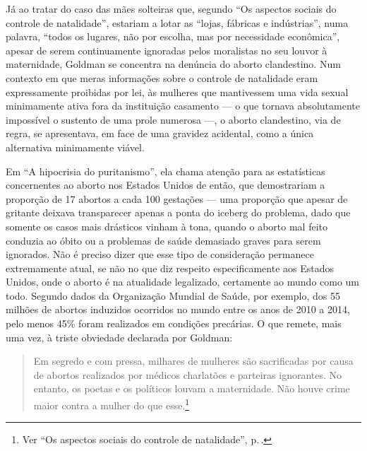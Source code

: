 Já ao
tratar do caso das mães solteiras que, segundo ``Os aspectos sociais
do controle de natalidade'', estariam a lotar as ``lojas, fábricas e
indústrias'', numa palavra, ``todos os lugares, não por escolha, mas por
necessidade econômica'', apesar de serem continuamente ignoradas pelos
moralistas no seu louvor à maternidade, Goldman se concentra na denúncia
do aborto clandestino. Num contexto em que meras informações sobre o
controle de natalidade eram expressamente proibidas por lei, às mulheres
que mantivessem uma vida sexual minimamente ativa fora da instituição
casamento --- o que tornava absolutamente impossível o sustento de uma
prole numerosa ---, o aborto clandestino, via de regra, se apresentava,
em face de uma gravidez acidental, como a única alternativa minimamente
viável. 

Em ``A hipocrisia do puritanismo'', ela chama atenção para as
estatísticas concernentes ao aborto nos Estados Unidos de então, que
demostrariam a proporção de 17 abortos a cada 100 gestações --- uma
proporção que apesar de gritante deixava transparecer apenas a ponta do
iceberg do problema, dado que somente os casos mais drásticos vinham à
tona, quando o aborto mal feito conduzia ao óbito ou a problemas de
saúde demasiado graves para serem ignorados. Não é preciso dizer que
esse tipo de consideração permanece extremamente atual, se não no que
diz respeito especificamente aos Estados Unidos, onde o aborto é na
atualidade legalizado, certamente ao mundo como um todo. Segundo dados
da Organização Mundial de Saúde, por exemplo, dos 55 milhões de abortos
induzidos ocorridos no mundo entre os anos de 2010 a 2014, pelo menos
45\% foram realizados em condições precárias. O que remete, mais uma
vez, à triste obviedade declarada por Goldman:

\begin{quote}
Em segredo e com pressa, milhares de
mulheres são sacrificadas por causa de abortos realizados por médicos
charlatões e parteiras ignorantes. No entanto, os poetas e os políticos
louvam a maternidade. Não houve crime maior contra a mulher do que esse.\footnote{Ver ``Os aspectos sociais do controle de natalidade'', p.\,\pageref{aborto}.}
\end{quote}

